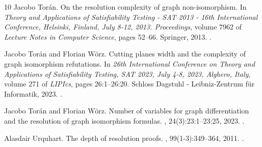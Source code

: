 \documentclass[10pt,a4paper]{article}
\begin{document}
\begin{thebibliography}{10}
Jacobo Tor{\'{a}}n.
\newblock On the resolution complexity of graph non-isomorphism.
\newblock In {\em Theory and Applications of Satisfiability Testing - {SAT}
  2013 - 16th International Conference, Helsinki, Finland, July 8-12, 2013.
  Proceedings}, volume 7962 of {\em Lecture Notes in Computer Science}, pages
  52--66. Springer, 2013.
\newblock \href {https://doi.org/10.1007/978-3-642-39071-5\_6}
  {}.

Jacobo Tor{\'{a}}n and Florian W{\"{o}}rz.
\newblock Cutting planes width and the complexity of graph isomorphism
  refutations.
\newblock In {\em 26th International Conference on Theory and Applications of
  Satisfiability Testing, {SAT} 2023, July 4-8, 2023, Alghero, Italy}, volume
  271 of {\em LIPIcs}, pages 26:1--26:20. Schloss Dagstuhl - Leibniz-Zentrum
  f{\"{u}}r Informatik, 2023.
\newblock \href {https://doi.org/10.4230/LIPICS.SAT.2023.26}
  {}.

Jacobo Tor{\'{a}}n and Florian W{\"{o}}rz.
\newblock Number of variables for graph differentiation and the resolution of
  graph isomorphism formulas.
, 24(3):23:1--23:25, 2023.
\newblock \href {https://doi.org/10.1145/3580478} {}.

Alasdair Urquhart.
\newblock The depth of resolution proofs.
, 99(1-3):349--364, 2011.
\newblock \href {https://doi.org/10.1007/S11225-011-9356-9}
  {}.

\end{thebibliography}
\end{document}
